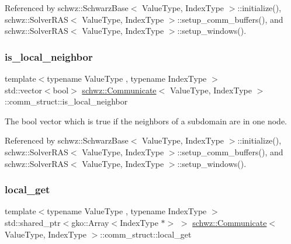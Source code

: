 Referenced by schwz\+::\+Schwarz\+Base$<$ Value\+Type, Index\+Type $>$\+::initialize(), schwz\+::\+Solver\+R\+A\+S$<$ Value\+Type, Index\+Type $>$\+::setup\+\_\+comm\+\_\+buffers(), and schwz\+::\+Solver\+R\+A\+S$<$ Value\+Type, Index\+Type $>$\+::setup\+\_\+windows().

\mbox{\label{structschwz_1_1Communicate_1_1comm__struct_a66536e858c43c5ebbba8bd3fb4b5e888}} 
\subsubsection{\texorpdfstring{is\+\_\+local\+\_\+neighbor}{is\_local\_neighbor}}
{\footnotesize\ttfamily template$<$typename Value\+Type , typename Index\+Type $>$ \\
std\+::vector$<$bool$>$ \hyperlink{classschwz_1_1Communicate}{schwz\+::\+Communicate}$<$ Value\+Type, Index\+Type $>$\+::comm\+\_\+struct\+::is\+\_\+local\+\_\+neighbor}



The bool vector which is true if the neighbors of a subdomain are in one node. 



Referenced by schwz\+::\+Schwarz\+Base$<$ Value\+Type, Index\+Type $>$\+::initialize(), schwz\+::\+Solver\+R\+A\+S$<$ Value\+Type, Index\+Type $>$\+::setup\+\_\+comm\+\_\+buffers(), and schwz\+::\+Solver\+R\+A\+S$<$ Value\+Type, Index\+Type $>$\+::setup\+\_\+windows().

\mbox{\label{structschwz_1_1Communicate_1_1comm__struct_a924b4a6e72c9e9b973c90f9753bc070b}} 
\subsubsection{\texorpdfstring{local\+\_\+get}{local\_get}}
{\footnotesize\ttfamily template$<$typename Value\+Type , typename Index\+Type $>$ \\
std\+::shared\+\_\+ptr$<$gko\+::\+Array$<$Index\+Type $\ast$$>$ $>$ \hyperlink{classschwz_1_1Communicate}{schwz\+::\+Communicate}$<$ Value\+Type, Index\+Type $>$\+::comm\+\_\+struct\+::local\+\_\+get}



